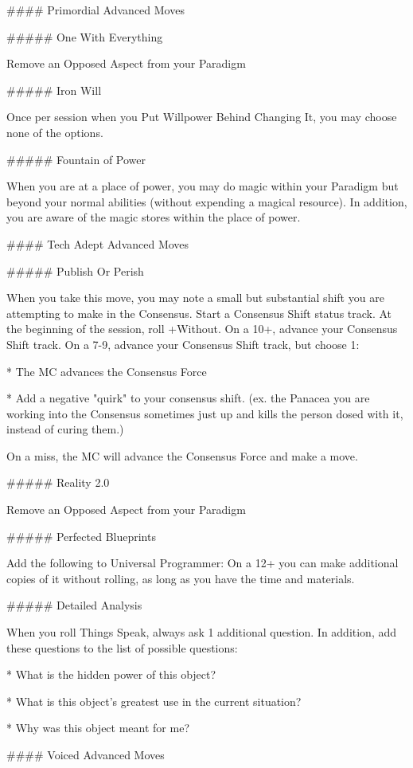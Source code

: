 \documentclass[
  oneside,
  statementpaper,
  9pt]{memoir}
\begin{document}
\begin{Player}
#### Primordial Advanced Moves

##### One With Everything

Remove an Opposed Aspect from your Paradigm

##### Iron Will

Once per session when you Put Willpower Behind Changing It, you may choose none of the options.

##### Fountain of Power

When you are at a place of power, you may do magic within your Paradigm but beyond your normal abilities (without expending a magical resource). In addition, you are aware of the magic stores within the place of power.

#### Tech Adept Advanced Moves

##### Publish Or Perish

 When you take this move, you may note a small but substantial shift you are attempting to make in the Consensus. Start a Consensus Shift status track. At the beginning of the session, roll +Without. On a 10+, advance your Consensus Shift track. On a 7-9, advance your Consensus Shift track, but choose 1:

* The MC advances the Consensus Force

* Add a negative "quirk" to your consensus shift. (ex. the Panacea you are working into the Consensus sometimes just up and kills the person dosed with it, instead of curing them.)

On a miss, the MC will advance the Consensus Force and make a move.

##### Reality 2.0

Remove an Opposed Aspect from your Paradigm

##### Perfected Blueprints

Add the following to Universal Programmer: On a 12+ you can make additional copies of it without rolling, as long as you have the time and materials.

##### Detailed Analysis

When you roll Things Speak, always ask 1 additional question. In addition, add these questions to the list of possible questions:

* What is the hidden power of this object?

* What is this object’s greatest use in the current situation?

* Why was this object meant for me?

#### Voiced Advanced Moves


\end{Player}
\end{document}
